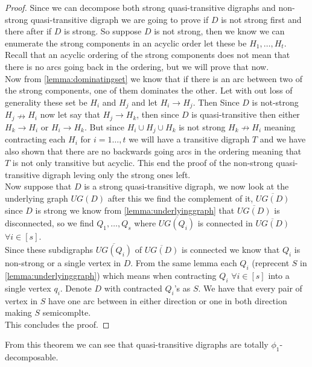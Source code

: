 \begin{proof}
    Since we can decompose both strong quasi-transitive digraphs and non-strong quasi-transitive digraph we are going to prove if $D$ is not strong first and there after if $D$ is strong.
    So suppose $D$ is not strong, then we know we can enumerate the strong components in an acyclic order let these be $H_1,\dots , H_t$. \\
    Recall that an acyclic ordering of the strong components does not mean that there is no arcs going back in the ordering, but we will prove that now. \\
    Now from \autoref{lemma:dominatingset} we know that if there is an arc between two of the strong components, one of them dominates the other.
    Let with out loss of generality these set be $H_i$ and $H_j$ and let $H_i\rightarrow H_j$. 
    Then Since $D$ is not-strong $H_j\nrightarrow H_i$ now let say that $H_j \rightarrow H_k$, then since $D$ is quasi-transitive then either $H_k\rightarrow H_i$ or $H_i \rightarrow H_k$. 
    But since $H_i\cup H_j \cup H_k$ is not strong $H_k\nrightarrow H_i$ meaning contracting each $H_i$ for $i=1\dots,t$ we will have a transitive digraph $T$ and we have also shown that there are no backwards going arcs in the ordering meaning that $T$ is not only transitive but acyclic. 
    This end the proof of the non-strong quasi-transitive digraph leving only the strong ones left.\\

    Now suppose that $D$ is a strong quasi-transitive digraph, we now look at the underlying graph $UG(D)$ after this we find the complement of it, $\overline{UG(D)}$ since $D$ is strong we know from \autoref{lemma:underlyinggraph} that $\overline{UG(D)}$ is disconnected, so we find $Q_1,\dots , Q_s$ where $\overline{UG(Q_i)}$ is connected in $\overline{UG(D)}$ $\forall i \in [s]$.\\ 
    Since these subdigraphs $\overline{UG(Q_i)}$ of $\overline{UG(D)}$ is connected we know that $Q_i$ is non-strong or a single vertex in $D$. 
    From the same lemma each $Q_i$ (reprecent $S$ in \autoref{lemma:underlyinggraph}) which means when contracting $Q_i$ $\forall i\in [s]$ into a single vertex $q_i$. 
    Denote $D$ with contracted $Q_i$'s as $S$. 
    We have that every pair of vertex in $S$ have one arc between in either direction or one in both direction making $S$ semicomplte. \\
    This concludes the proof.
\end{proof}
From this theorem we can see that quasi-transitive digraphs are totally $\phi_1$-decomposable. 

